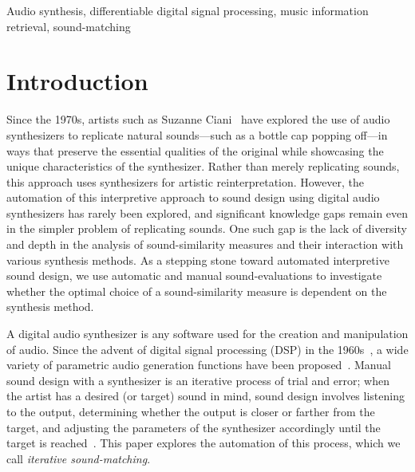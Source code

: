 \documentclass[lettersize,journal]{IEEEtran}
\providecommand{\gls}[1]{#1}
\begin{document}
\begin{IEEEkeywords}
Audio synthesis, differentiable digital signal processing, music information retrieval, sound-matching
\end{IEEEkeywords}

\section{Introduction}
Since the 1970s, artists such as Suzanne Ciani~\cite{ciani_life_in_waves} have explored the use of audio synthesizers to replicate natural sounds—such as a bottle cap popping off—in ways that preserve the essential qualities of the original while showcasing the unique characteristics of the synthesizer. Rather than merely replicating sounds, this approach uses synthesizers for artistic reinterpretation. However, the automation of this interpretive approach to sound design using digital audio synthesizers has rarely been explored, and significant knowledge gaps remain even in the simpler problem of replicating sounds. One such gap is the lack of diversity and depth in the analysis of sound-similarity measures and their interaction with various synthesis methods. As a stepping stone toward automated interpretive sound design, we use automatic and manual sound-evaluations to investigate whether the optimal choice of a sound-similarity measure is dependent on the synthesis method.

A digital audio synthesizer is any software used for the creation and manipulation of audio. Since the advent of digital signal processing (\gls{DSP}) in the 1960s~\cite{stranneby2004digital}, a wide variety of parametric audio generation functions have been proposed~\cite{lyons1997understanding,russ1999sound,shier2020spiegelib}. Manual sound design with a synthesizer is an iterative process of trial and error; when the artist has a desired (or target) sound in mind, sound design involves listening to the output, determining whether the output is closer or farther from the target, and adjusting the parameters of the synthesizer accordingly until the target is reached~\cite{russ1999sound}. This paper explores the automation of this process, which we call \textit{iterative sound-matching}. 
\end{document}
